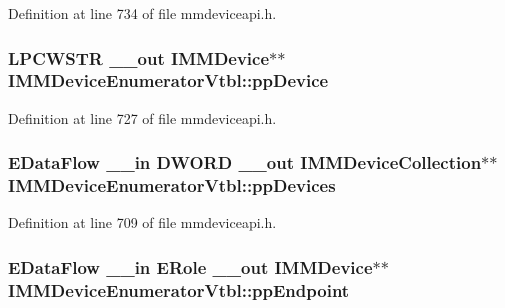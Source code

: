 Definition at line 734 of file mmdeviceapi.\+h.

\subsubsection[{\texorpdfstring{pp\+Device}{ppDevice}}]{ {\bf L\+P\+C\+W\+S\+TR} {\bf \+\_\+\+\_\+out} {\bf I\+M\+M\+Device}$\ast$$\ast$ I\+M\+M\+Device\+Enumerator\+Vtbl\+::pp\+Device}\hypertarget{struct_i_m_m_device_enumerator_vtbl_a1a3c2414790298a4af9aa9f946c9e1e0}{}\label{struct_i_m_m_device_enumerator_vtbl_a1a3c2414790298a4af9aa9f946c9e1e0}


Definition at line 727 of file mmdeviceapi.\+h.

\subsubsection[{\texorpdfstring{pp\+Devices}{ppDevices}}]{ {\bf E\+Data\+Flow} {\bf \+\_\+\+\_\+in} {\bf D\+W\+O\+RD} {\bf \+\_\+\+\_\+out} {\bf I\+M\+M\+Device\+Collection}$\ast$$\ast$ I\+M\+M\+Device\+Enumerator\+Vtbl\+::pp\+Devices}\hypertarget{struct_i_m_m_device_enumerator_vtbl_abb736c7a6499fb1b3b1789236939617e}{}\label{struct_i_m_m_device_enumerator_vtbl_abb736c7a6499fb1b3b1789236939617e}


Definition at line 709 of file mmdeviceapi.\+h.

\subsubsection[{\texorpdfstring{pp\+Endpoint}{ppEndpoint}}]{ {\bf E\+Data\+Flow} {\bf \+\_\+\+\_\+in} {\bf E\+Role} {\bf \+\_\+\+\_\+out} {\bf I\+M\+M\+Device}$\ast$$\ast$ I\+M\+M\+Device\+Enumerator\+Vtbl\+::pp\+Endpoint}\hypertarget{struct_i_m_m_device_enumerator_vtbl_acb453bc75d9d62e267fd6bceaf89da43}{}\label{struct_i_m_m_device_enumerator_vtbl_acb453bc75d9d62e267fd6bceaf89da43}


